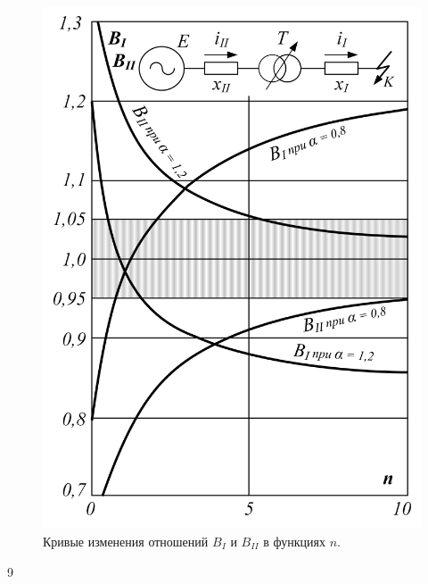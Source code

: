 \begin{figure} %
	\centering
	\includegraphics[width=0.95\linewidth]{pic/2-2}
	\caption{Кривые изменения отношений $ B_I $ и $ B_{II} $ в функциях $ n $.}
	\label{fig:2-2 B_I and B_I}
\end{figure}9

